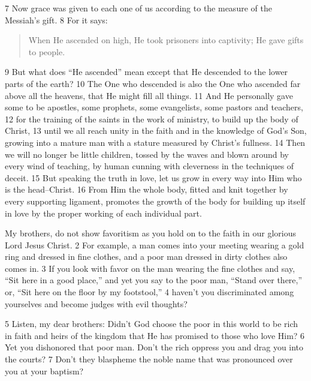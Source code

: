 \begin{bible}
7 Now grace was given to each one of us according to the measure of the Messiah's gift. 8 For it says:
\begin{quote}
When He ascended on high,
He took prisoners into captivity;
He gave gifts to people.
\end{quote}
9 But what does ``He ascended'' mean except that He descended to the lower parts of the earth? 10 The One who descended is also the One who ascended far above all the heavens, that He might fill all things. 11 And He personally gave some to be apostles, some prophets, some evangelists, some pastors and teachers, 12 for the training of the saints in the work of ministry, to build up the body of Christ, 13 until we all reach unity in the faith and in the knowledge of God's Son, growing into a mature man with a stature measured by Christ's fullness. 14 Then we will no longer be little children, tossed by the waves and blown around by every wind of teaching, by human cunning with cleverness in the techniques of deceit. 15 But speaking the truth in love, let us grow in every way into Him who is the head--Christ. 16 From Him the whole body, fitted and knit together by every supporting ligament, promotes the growth of the body for building up itself in love by the proper working of each individual part.

My brothers, do not show favoritism as you hold on to the faith in our glorious Lord Jesus Christ. 2 For example, a man comes into your meeting wearing a gold ring and dressed in fine clothes, and a poor man dressed in dirty clothes also comes in. 3 If you look with favor on the man wearing the fine clothes and say, ``Sit here in a good place,'' and yet you say to the poor man, ``Stand over there,'' or, ``Sit here on the floor by my footstool,'' 4 haven't you discriminated among yourselves and become judges with evil thoughts?

5 Listen, my dear brothers: Didn't God choose the poor in this world to be rich in faith and heirs of the kingdom that He has promised to those who love Him? 6 Yet you dishonored that poor man. Don’t the rich oppress you and drag you into the courts? 7 Don't they blaspheme the noble name that was pronounced over you at your baptism?

\end{bible}

